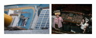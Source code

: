 \documentclass{acm_proc_article-sp}
\newcommand{\thumbheight}{16mm}
\newenvironment{thumbsequence}{}{\makebox[4mm]{}}
\begin{document}
\begin{figure}
\begin{centering}
\begin{thumbsequence}
		\includegraphics[height=\thumbheight]{resources/concordia/looseduplicate4.jpg}
	\end{thumbsequence}
	\begin{thumbsequence}
		\includegraphics[height=\thumbheight]{resources/concordia/looseduplicate5.jpg}

\end{thumbsequence}
\end{centering}
\end{figure}
\end{document}
